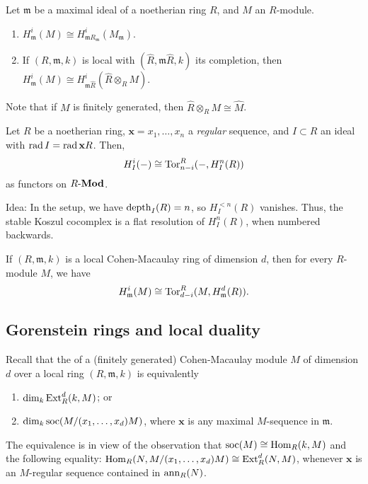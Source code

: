 \documentclass[12pt]{article}
\begin{document}
\begin{prop}
	Let $\mathfrak{m}$ be a maximal ideal of a noetherian ring $R$, and $M$ an $R$-module.
	\begin{enumerate}[label=(\alph*)]
		\item $H_{\mathfrak{m}}^{i}(M) \cong H_{\mathfrak{m} R_{\mathfrak{m}}}^{i}(M_{\mathfrak{m}})$.
		\item If $(R, \mathfrak{m}, k)$ is local with $(\widehat{R}, \mathfrak{m} \widehat{R}, k)$ its completion, then $H_{\mathfrak{m}}^{i}(M) \cong H_{\mathfrak{m} \widehat{R}}^{i}(\widehat{R} \otimes_{R} M)$.
	\end{enumerate}
\end{prop}
Note that if $M$ is finitely generated, then $\widehat{R} \otimes_{R} M \cong \widehat{M}$.

\begin{lem} 
	Let $R$ be a noetherian ring, $\mathbf{x} = x_{1}, \ldots, x_{n}$ a \emph{regular} sequence, and $I \subset R$ an ideal with $\operatorname{rad} I = \operatorname{rad} \mathbf{x} R$. Then,
	\begin{equation*} 
		H_{I}^{i}(-) \cong \operatorname{Tor}^{R}_{n - i}(-, H_{I}^{n}(R))
	\end{equation*}
	as functors on $R\text{-}\mathbf{Mod}$.
\end{lem}
Idea: In the setup, we have $\operatorname{depth}_{I}(R) = n$, so $H_{I}^{<n}(R)$ vanishes. Thus, the stable Koszul cocomplex is a flat resolution of $H_{I}^{n}(R)$, when numbered backwards.

\begin{cor} \label{cor:cohen-macaulay-local-cohomology-tor}
	If $(R, \mathfrak{m}, k)$ is a local Cohen-Macaulay ring of dimension $d$, then for every $R$-module $M$, we have
	\begin{equation*} 
		H_{\mathfrak{m}}^{i}(M) \cong \operatorname{Tor}^{R}_{d - i}(M, H_{\mathfrak{m}}^{d}(R)).
	\end{equation*}
\end{cor}

\subsection{Gorenstein rings and local duality}

Recall that the  of a (finitely generated) Cohen-Macaulay module $M$ of dimension $d$ over a local ring $(R, \mathfrak{m}, k)$ is equivalently
\begin{enumerate}[label=(\alph*)]
	\item $\dim_{k} \operatorname{Ext}_{R}^{d}(k, M)$; or
	\item $\dim_{k} \operatorname{soc}(M/(x_{1}, \ldots, x_{d}) M)$, where $\mathbf{x}$ is any maximal $M$-sequence in $\mathfrak{m}$.
\end{enumerate}	
The equivalence is in view of the observation that $\operatorname{soc}(M) \cong \operatorname{Hom}_{R}(k, M)$ and the following equality: $\operatorname{Hom}_{R}(N, M/(x_{1}, \ldots, x_{d}) M) \cong \operatorname{Ext}_{R}^{d}(N, M)$, whenever $\mathbf{x}$ is an $M$-regular sequence contained in $\operatorname{ann}_{R}(N)$.
\end{document}
